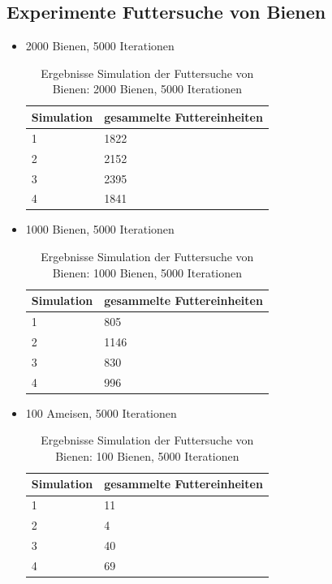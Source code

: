 \documentclass[a4paper, 11pt]{article}
\begin{document}
\subsection{Experimente Futtersuche von Bienen}
\begin{itemize}
	\item 2000 Bienen, 5000 Iterationen
	\begin{table}[h]
		\begin{tabular}{p{2.5cm}|p{11cm}}
			Simulation & gesammelte Futtereinheiten\\ \hline\hline
			1 & 1822\\ \hline
			2 & 2152\\ \hline
			3 & 2395\\ \hline
			4 & 1841\\ \hline
		\end{tabular}
		\caption{Ergebnisse Simulation der Futtersuche von Bienen: 2000 Bienen, 5000 Iterationen}
		\label{tabframework}
	\end{table}
	\item 1000 Bienen, 5000 Iterationen
	\begin{table}[h]
		\begin{tabular}{p{2.5cm}|p{11cm}}
			Simulation & gesammelte Futtereinheiten\\ \hline\hline
			1 & 805\\ \hline
			2 & 1146\\ \hline
			3 & 830\\ \hline
			4 & 996\\ \hline
		\end{tabular}
		\caption{Ergebnisse Simulation der Futtersuche von Bienen: 1000 Bienen, 5000 Iterationen}
		\label{tabframework}
	\end{table}
	\item 100 Ameisen, 5000 Iterationen
	\begin{table}[h]
		\begin{tabular}{p{2.5cm}|p{11cm}}
			Simulation & gesammelte Futtereinheiten\\ \hline\hline
			1 & 11\\ \hline
			2 & 4\\ \hline
			3 & 40\\ \hline
			4 & 69\\ \hline
		\end{tabular}
		\caption{Ergebnisse Simulation der Futtersuche von Bienen: 100 Bienen, 5000 Iterationen}
		\label{tabframework}
	\end{table}
\end{itemize}
\end{document}
